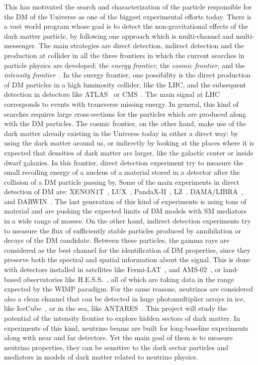 \documentclass[a4paper,10pt,epsfig,epsf,amsfonts,amsmath]{article}
\begin{document}
\begin{old}
This has motivated the search and characterization of the particle
responsible for  the DM of the Universe as one of the biggest
experimental efforts today.
There is a vast world program whose goal is to detect the
non-gravitational effects of the dark matter particle, by following
one approach which is multi-channel and multi-messenger.
The main strategies are direct detection, indirect detection
and the production at collider in all the three frontiers in which the
current searches in particle physics are developed: the \emph{energy
  frontier}, the \emph{cosmic frontier}, and the \emph{intensity
  frontier}~\cite{Hewett:2012ns}.  In the energy frontier, one possibility
is the direct production of DM particles in a high luminosity collider,
like the LHC, and the subsequent detection in detectors like
ATLAS~\cite{Tolley:2016lbg} or CMS~\cite{Sirunyan:2016iap}.  The main
signal at LHC corresponds to events with transverse missing energy. In
general, this kind of searches requires large cross-sections for the
particles which are produced along with the DM particles.
The cosmic frontier, on the other hand, make use
of the dark matter already existing in the Universe today in either a
direct way: by using the dark matter around us, or indirectly by
looking at the places where it is expected that densities of dark
matter are larger, like the galactic center or inside dwarf galaxies.
In this frontier, direct detection experiment try to measure the small
recoiling energy of a nucleus of a material stored in a detector after
the collision of a DM particle passing by.  Some of the main
experiments in direct detection of DM are: XENON1T~\cite{Aprile:2018dbl},
LUX~\cite{Akerib:2016vxi}, PandaX-II~\cite{Tan:2016zwf},
LZ~\cite{Mount:2017qzi}, DAMA/LIBRA~\cite{Bernabei:2013xsa}, and
DARWIN~\cite{Aalbers:2016jon}.
The last generation of this kind of experiments is using tons of
material and are pushing the expected limits of DM models with SM
mediators in a wide range of masses.
On the other hand, indirect detection experiments try to measure the
flux of sufficiently stable particles produced by annihilation or
decays of the DM candidate.
Between these particles, the gamma rays are considered as the best
channel for the identification of DM properties, since they preserve
both the spectral and spatial information about the signal.
This is done with detectors installed in satellites like
Fermi-LAT~\cite{Fermi-LAT:2016uux}, and
AMS-02~\cite{Pizzolotto:2016lwk}, or land-based observatories like
H.E.S.S.~\cite{Lefranc:2016srp}, all of which are taking data in the
range expected by the WIMP paradigm.
For the same reasons, neutrinos are considered also a clean channel
that can be detected in huge photomultiplier arrays in
ice, like IceCube~\cite{Aartsen:2016zhm}, or in the sea, like ANTARES~\cite{Albert:2016emp}.
This project will study the potential of the intensity frontier to
explore hidden sectors of dark matter. In experiments of this kind, 
neutrino beams are built for long-baseline experiments along with near
and far detectors. Yet the main goal of them is to measure neutrino
properties, they can be sensitive to the dark sector particles and mediators in models of dark matter related to neutrino physics.


\end{old}
\end{document}
